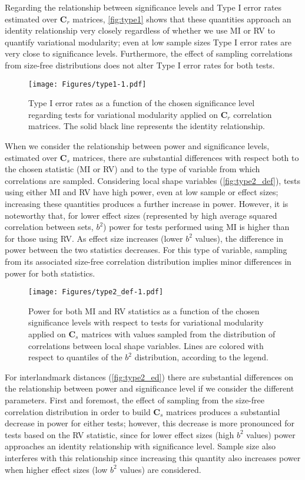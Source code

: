 \documentclass[12pt,twoside]{report}
\begin{document}
Regarding the relationship between significance levels and Type I error
rates estimated over $\mathbf{C}_r$ matrices, \autoref{fig:type1} shows
that these quantities approach an identity relationship very closely
regardless of whether we use MI or RV to quantify variational
modularity; even at low sample sizes Type I error rates are very close
to significance levels. Furthermore, the effect of sampling correlations
from size-free distributions does not alter Type I error rates for both
tests.

\begin{figure}[htbp]
\centering
\texttt{[image: Figures/type1-1.pdf]}
\caption{Type I error rates as a function of the chosen significance
level regarding tests for variational modularity applied on
$\mathbf{C}_r$ correlation matrices. The solid black line represents the
identity relationship. \label{fig:type1}}
\end{figure}

When we consider the relationship between power and significance levels,
estimated over $\mathbf{C}_s$ matrices, there are substantial
differences with respect both to the chosen statistic (MI or RV) and to
the type of variable from which correlations are sampled. Considering
local shape variables (\autoref{fig:type2_def}), tests using either MI
and RV have high power, even at low sample or effect sizes; increasing
these quantities produces a further increase in power. However, it is
noteworthy that, for lower effect sizes (represented by high average
squared correlation between sets, $b^2$) power for tests performed using
MI is higher than for those using RV. As effect size increases (lower
$b^2$ values), the difference in power between the two statistics
decreases. For this type of variable, sampling from its associated
size-free correlation distribution implies minor differences in power
for both statistics.

\begin{figure}[htbp]
\centering
\texttt{[image: Figures/type2\_def-1.pdf]}
\caption{Power for both MI and RV statistics as a function of the chosen
significance levels with respect to tests for variational modularity
applied on $\mathbf{C}_s$ matrices with values sampled from the
distribution of correlations between local shape variables. Lines are
colored with respect to quantiles of the $b^2$ distribution, according
to the legend. \label{fig:type2_def}}
\end{figure}

For interlandmark distances (\autoref{fig:type2_ed}) there are
substantial differences on the relationship between power and
significance level if we consider the different parameters. First and
foremost, the effect of sampling from the size-free correlation
distribution in order to build $\mathbf{C}_s$ matrices produces a
substantial decrease in power for either tests; however, this decrease
is more pronounced for tests based on the RV statistic, since for lower
effect sizes (high $b^2$ values) power approaches an identity
relationship with significance level. Sample size also interferes with
this relationship since increasing this quantity also increases power
when higher effect sizes (low $b^2$ values) are considered.
\end{document}
